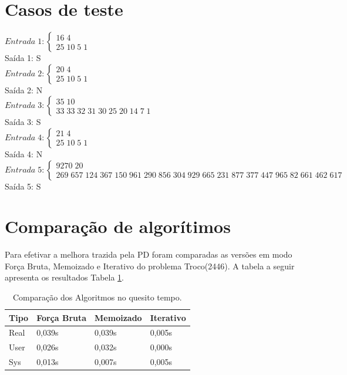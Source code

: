 \documentclass[12pt]{article}
\newcommand\tab[1][1cm]{\hspace*{#1}}
\begin{document}
\section{Casos de teste} \label{sec:marker}
$Entrada\;1: \left \{ \begin{matrix} 16\;4 & \mbox{}\mbox{}\\
25\;10\;5\;1 & \mbox{}\mbox{}\end{matrix} \right.$
\\
\tab Saída 1: S\\
$Entrada\;2: \left \{ \begin{matrix} 20\;4 & \mbox{}\mbox{}\\
25\;10\;5\;1 & \mbox{}\mbox{}\end{matrix} \right.$
\\
\tab Saída 2: N\\
$Entrada\;3: \left \{ \begin{matrix} 35\;10 & \mbox{}\mbox{}\\
33\;33\;32\;31\;30\;25\;20\;14\;7\;1 & \mbox{}\mbox{}\end{matrix} \right.$
\\
\tab Saída 3: S\\
$Entrada\;4: \left \{ \begin{matrix} 21\;4 & \mbox{}\mbox{}\\
25\;10\;5\;1 & \mbox{}\mbox{}\end{matrix} \right.$
\\
\tab Saída 4: N\\
$Entrada\;5: \left \{ \begin{matrix} 9270\;20 & \mbox{}\mbox{}\\
269\;657\;124\;367\;150\;961\;290\;856\;304\;929\;665\;231\;877\;377\;447\;965\;82\;661\;462\;617 & \mbox{}\mbox{}\end{matrix} \right.$
\\
\tab Saída 5: S
\section{Comparação de algorítimos}
Para efetivar a melhora trazida pela PD foram comparadas as versões em modo Força Bruta, Memoizado e Iterativo do problema Troco(2446). A tabela a seguir apresenta os resultados Tabela \ref{tab:comp}. 
\begin{table}[h]
\centering
\caption{Comparação dos Algoritmos no quesito tempo.}
\label{tab:comp}
\begin{tabular}{|l|l|l|l|}
\hline
\rowcolor[HTML]{FFCC67} 
Tipo & Força Bruta & Memoizado & \cellcolor[HTML]{FFCB2F}Iterativo \\ \hline
Real & 0,039s      & 0,039s    & 0,005s                            \\ \hline
User & 0,026s      & 0,032s    & 0,000s                            \\ \hline
Sys  & 0,013s      & 0,007s    & 0,005s                            \\ \hline
\end{tabular}
\end{table}
\end{document}
